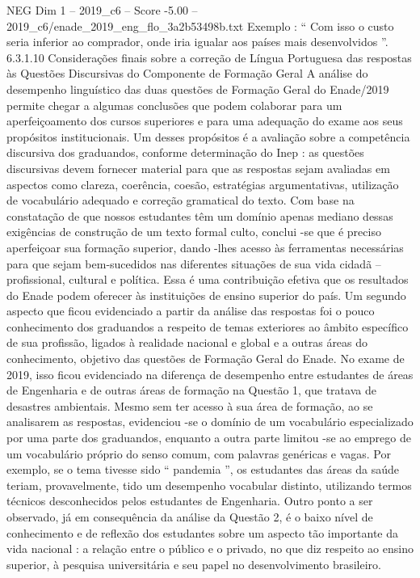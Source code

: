 \begin{textsample}{NEG Dim 1 – 2019\_c6 – Score -5.00 – 2019\_c6/enade\_2019\_eng\_flo\_3a2b53498b.txt}
Exemplo : “ Com isso o custo seria inferior ao comprador, onde iria igualar aos países mais desenvolvidos ”. 6.3.1.10 Considerações finais sobre a correção de Língua Portuguesa das respostas às Questões Discursivas do Componente de Formação Geral A análise do desempenho linguístico das duas questões de Formação Geral do Enade/2019 permite chegar a algumas conclusões que podem colaborar para um aperfeiçoamento dos cursos superiores e para uma adequação do exame aos seus propósitos institucionais.
Um desses propósitos é a avaliação sobre a competência discursiva dos graduandos, conforme determinação do Inep : as questões discursivas devem fornecer material para que as respostas sejam avaliadas em aspectos como clareza, coerência, coesão, estratégias argumentativas, utilização de vocabulário adequado e correção gramatical do texto.
Com base na constatação de que nossos estudantes têm um domínio apenas mediano dessas exigências de construção de um texto formal culto, conclui -se que é preciso aperfeiçoar sua formação superior, dando -lhes acesso às ferramentas necessárias para que sejam bem-sucedidos nas diferentes situações de sua vida cidadã – profissional, cultural e política.
Essa é uma contribuição efetiva que os resultados do Enade podem oferecer às instituições de ensino superior do país.
Um segundo aspecto que ficou evidenciado a partir da análise das respostas foi o pouco conhecimento dos graduandos a respeito de temas exteriores ao âmbito específico de sua profissão, ligados à realidade nacional e global e a outras áreas do conhecimento, objetivo das questões de Formação Geral do Enade.
No exame de 2019, isso ficou evidenciado na diferença de desempenho entre estudantes de áreas de Engenharia e de outras áreas de formação na Questão 1, que tratava de desastres ambientais.
Mesmo sem ter acesso à sua área de formação, ao se analisarem as respostas, evidenciou -se o domínio de um vocabulário especializado por uma parte dos graduandos, enquanto a outra parte limitou -se ao emprego de um vocabulário próprio do senso comum, com palavras genéricas e vagas.
Por exemplo, se o tema tivesse sido “ pandemia ”, os estudantes das áreas da saúde teriam, provavelmente, tido um desempenho vocabular distinto, utilizando termos técnicos desconhecidos pelos estudantes de Engenharia.
Outro ponto a ser observado, já em consequência da análise da Questão 2, é o baixo nível de conhecimento e de reflexão dos estudantes sobre um aspecto tão importante da vida nacional : a relação entre o público e o privado, no que diz respeito ao ensino superior, à pesquisa universitária e seu papel no desenvolvimento brasileiro.

\end{textsample}
